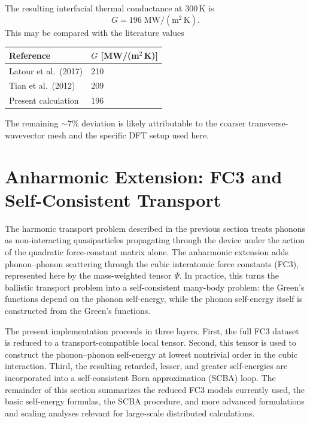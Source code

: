 The resulting interfacial thermal conductance at 300\,K is
\begin{equation}
  G = 196\;\mathrm{MW/(m^2\,K)}.
\end{equation}
This may be compared with the literature values
\begin{center}
\begin{tabular}{ll}
  \toprule
  Reference & $G$ [MW/(m$^2$\,K)] \\
  \midrule
  Latour et al.\ (2017) & 210 \\
  Tian et al.\ (2012) & 209 \\
  Present calculation & 196 \\
  \bottomrule
\end{tabular}
\end{center}
The remaining $\sim 7\%$ deviation is likely attributable to the coarser
transverse-wavevector mesh and the specific DFT setup used here.

\section{Anharmonic Extension: FC3 and Self-Consistent Transport}
\label{sec:anharmonic_transport}

The harmonic transport problem described in the previous section treats
phonons as non-interacting quasiparticles propagating through the device
under the action of the quadratic force-constant matrix alone.  The
anharmonic extension adds phonon--phonon scattering through the cubic
interatomic force constants (FC3), represented here by the mass-weighted
tensor $\Psi$.  In practice, this turns the ballistic transport problem
into a self-consistent many-body problem: the Green's functions depend
on the phonon self-energy, while the phonon self-energy itself is
constructed from the Green's functions.

The present implementation proceeds in three layers.  First, the full
FC3 dataset is reduced to a transport-compatible local tensor.  Second,
this tensor is used to construct the phonon--phonon self-energy at
lowest nontrivial order in the cubic interaction.  Third, the resulting
retarded, lesser, and greater self-energies are incorporated into a
self-consistent Born approximation (SCBA) loop.  The remainder of this
section summarizes the reduced FC3 models currently used, the basic
self-energy formulas, the SCBA procedure, and more advanced
formulations and scaling analyses relevant for large-scale distributed
calculations.

